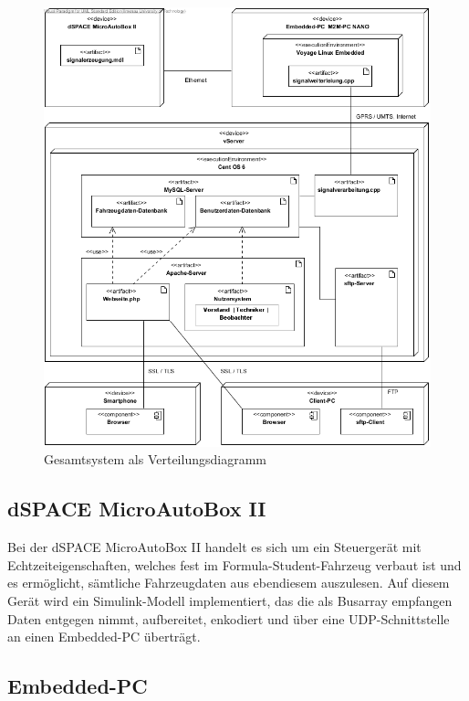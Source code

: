 \documentclass[fontsize = 12pt, paper = a4]{scrreprt}
\begin{document}
\begin{figure}[h]
\centering
\includegraphics[scale = 0.7]{verteilungsdiagramm.png}
\caption[Verteilungsdiagramm Gesamtsystem]{Gesamtsystem als Verteilungsdiagramm} 

\end{figure}

\subsection{dSPACE MicroAutoBox II}

Bei der dSPACE MicroAutoBox II handelt es sich um ein Steuergerät mit Echtzeiteigenschaften, welches fest im Formula-Student-Fahrzeug verbaut ist und es ermöglicht, sämtliche Fahrzeugdaten aus ebendiesem auszulesen. Auf diesem Gerät wird ein Simulink-Modell implementiert, das die als Busarray empfangen Daten entgegen nimmt, aufbereitet, enkodiert und über eine UDP-Schnittstelle an einen Embedded-PC überträgt. 

\subsection{Embedded-PC}
\end{document}
